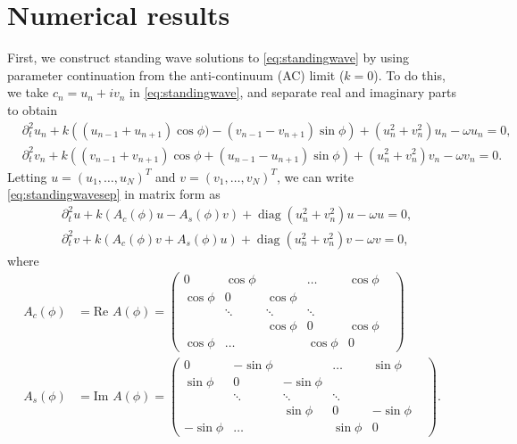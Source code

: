 \documentclass[11pt,reqno]{amsart}
\DeclareMathOperator{\diag}{diag}
\begin{document}
\section{Numerical results}\label{sec:numerics}

First, we construct standing wave solutions to \cref{eq:standingwave} by using parameter continuation from the anti-continuum (AC) limit ($k=0$). To do this, we take $c_n = u_n + i v_n$ in \cref{eq:standingwave}, and separate real and imaginary parts to obtain
\begin{equation}\label{eq:standingwavesep}
\begin{aligned}
&\partial_t^2 u_n + k\left( (u_{n-1} + u_{n+1}) \cos \phi ) - (v_{n-1} - v_{n+1})\sin \phi \right) + (u_n^2+v_n^2) u_n - \omega u_n= 0, \\
&\partial_t^2 v_n + k\left( (v_{n-1} + v_{n+1} ) \cos \phi + (u_{n-1}- u_{n+1})\sin \phi \right) +(u_n^2+v_n^2) v_n - \omega v_n = 0.
\end{aligned}
\end{equation}
Letting $u = (u_1, \dots, u_N)^T$ and $v = (v_1, \dots, v_N)^T$, we can write \cref{eq:standingwavesep} in matrix form as 
\begin{equation}\label{eq:standingwavematrixsep}
\begin{aligned}
&\partial_t^2 u + k (A_c(\phi) u - A_s(\phi) v) + \diag\left(u_n^2 + v_n^2 \right)u - \omega u = 0, \\
&\partial_t^2 v + k (A_c(\phi) v + A_s(\phi) u) + \diag\left(u_n^2 + v_n^2 \right)v - \omega v = 0,
\end{aligned}
\end{equation}
where
\begin{align*}
A_c(\phi) &= \text{Re } A(\phi) = \begin{pmatrix}
0 & \cos \phi & & \dots & \cos \phi \\
\cos \phi & 0 & \cos \phi & & & \\
& \ddots & \ddots & \ddots &  & \\
 & &\cos \phi  & 0 & \cos \phi  \\
\cos \phi& \dots & & \cos \phi & 0
\end{pmatrix} \\
A_s(\phi) &= \text{Im } A(\phi) = \begin{pmatrix}
0 & -\sin \phi & & \dots & \sin \phi \\
\sin \phi & 0 & -\sin \phi & & & \\
& \ddots & \ddots & \ddots &  & \\
 & &\sin \phi  & 0 & -\sin \phi  \\
-\sin \phi& \dots & & \sin \phi & 0
\end{pmatrix}.
\end{align*}
\end{document}
